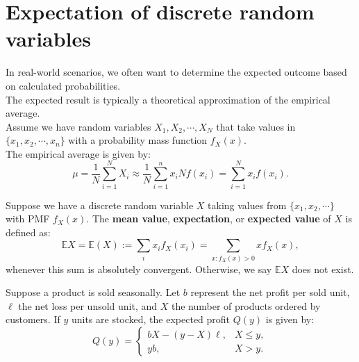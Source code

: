 \documentclass{huhtakm-template-book}
\newcommand{\expect}{\mathbb{E}}
\begin{document}
\section{Expectation of discrete random variables}
    In real-world scenarios, we often want to determine the expected outcome based on calculated probabilities.\\
    The expected result is typically a theoretical approximation of the empirical average.\\
    Assume we have random variables $X_{1},X_{2},\cdots,X_{N}$ that take values in $\{x_{1},x_{2},\cdots,x_{n}\}$ with a probability mass function $f_{X}(x)$.\\
    The empirical average is given by:
    \begin{equation*}
        \mu=\frac{1}{N}\sum_{i=1}^{N}X_{i}\approx\frac{1}{N}\sum_{i=1}^{n}x_{i}Nf(x_{i})=\sum_{i=1}^{N}x_{i}f(x_{i}).
    \end{equation*}
    \begin{defn}
        Suppose we have a discrete random variable $X$ taking values from $\{x_{1},x_{2},\cdots\}$ with PMF $f_{X}(x)$. The \textbf{mean value}, \textbf{expectation}, or \textbf{expected value} of $X$ is defined as:
        \begin{equation*}
            \expect X=\expect(X):=\sum_{i}x_{i}f_{X}(x_{i})=\sum_{x:f_{X}(x)>0}xf_{X}(x),
        \end{equation*}
        whenever this sum is absolutely convergent. Otherwise, we say $\expect X$ does not exist.
    \end{defn}
    \begin{eg}
        Suppose a product is sold seasonally. Let $b$ represent the net profit per sold unit, $\ell$ the net loss per unsold unit, and $X$ the number of products ordered by customers. If $y$ units are stocked, the expected profit $Q(y)$ is given by:
        \begin{equation*}
            Q(y)=\begin{cases}
                bX-(y-X)\ell, &X\leq y,\\
                yb, &X>y.
            \end{cases}
        \end{equation*}
    \end{eg}
    \newpage
    
\end{document}
